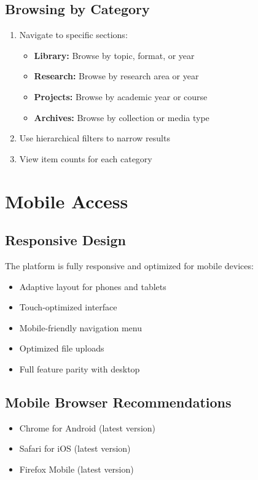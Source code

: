 \documentclass[12pt,a4paper]{article}
\begin{document}
\subsection{Browsing by Category}
\begin{enumerate}[leftmargin=*]
    \item Navigate to specific sections:
        \begin{itemize}
            \item \textbf{Library:} Browse by topic, format, or year
            \item \textbf{Research:} Browse by research area or year
            \item \textbf{Projects:} Browse by academic year or course
            \item \textbf{Archives:} Browse by collection or media type
        \end{itemize}
    \item Use hierarchical filters to narrow results
    \item View item counts for each category
\end{enumerate}

\section{Mobile Access}

\subsection{Responsive Design}
The platform is fully responsive and optimized for mobile devices:
\begin{itemize}[leftmargin=*]
    \item Adaptive layout for phones and tablets
    \item Touch-optimized interface
    \item Mobile-friendly navigation menu
    \item Optimized file uploads
    \item Full feature parity with desktop
\end{itemize}

\subsection{Mobile Browser Recommendations}
\begin{itemize}[leftmargin=*]
    \item Chrome for Android (latest version)
    \item Safari for iOS (latest version)
    \item Firefox Mobile (latest version)
\end{itemize}
\end{document}
